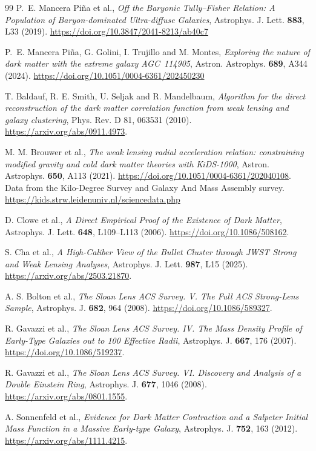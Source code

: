 \documentclass[11pt]{article}
\begin{document}
\begin{thebibliography}{99}
P.~E. Mancera Pi\~na et al.,
\emph{Off the Baryonic Tully--Fisher Relation: A Population of
Baryon-dominated Ultra-diffuse Galaxies},
Astrophys. J. Lett. \textbf{883}, L33 (2019).
\url{https://doi.org/10.3847/2041-8213/ab40c7}

P.~E. Mancera Pi\~na, G. Golini, I. Trujillo and M. Montes,
\emph{Exploring the nature of dark matter with the extreme galaxy AGC~114905},
Astron. Astrophys. \textbf{689}, A344 (2024).
\url{https://doi.org/10.1051/0004-6361/202450230}

T. Baldauf, R. E. Smith, U. Seljak and R. Mandelbaum,
\emph{Algorithm for the direct reconstruction of the dark matter correlation
function from weak lensing and galaxy clustering}, Phys. Rev. D 81,
063531 (2010). \url{https://arxiv.org/abs/0911.4973}.

M. M. Brouwer et al.,
\emph{The weak lensing radial acceleration relation: constraining modified
gravity and cold dark matter theories with KiDS-1000},
Astron. Astrophys. \textbf{650}, A113 (2021).
\url{https://doi.org/10.1051/0004-6361/202040108}.
Data from the Kilo-Degree Survey and Galaxy And Mass Assembly survey.
\url{https://kids.strw.leidenuniv.nl/sciencedata.php}

D. Clowe et al., \emph{A Direct Empirical Proof of the Existence of Dark
Matter}, Astrophys. J. Lett. \textbf{648}, L109--L113 (2006).
\url{https://doi.org/10.1086/508162}.

S. Cha et al., \emph{A High-Caliber View of the Bullet Cluster through
JWST Strong and Weak Lensing Analyses}, Astrophys. J. Lett.
\textbf{987}, L15 (2025). \url{https://arxiv.org/abs/2503.21870}.

A. S. Bolton et al., \emph{The Sloan Lens ACS Survey. V.
The Full ACS Strong-Lens Sample}, Astrophys. J. \textbf{682}, 964 (2008).
\url{https://doi.org/10.1086/589327}.

R. Gavazzi et al., \emph{The Sloan Lens ACS Survey. IV. The Mass Density
Profile of Early-Type Galaxies out to 100 Effective Radii},
Astrophys. J. \textbf{667}, 176 (2007). \url{https://doi.org/10.1086/519237}.

R. Gavazzi et al., \emph{The Sloan Lens ACS Survey. VI. Discovery and
Analysis of a Double Einstein Ring}, Astrophys. J. \textbf{677}, 1046 (2008).
\url{https://arxiv.org/abs/0801.1555}.

A. Sonnenfeld et al., \emph{Evidence for Dark Matter Contraction and a
Salpeter Initial Mass Function in a Massive Early-type Galaxy},
Astrophys. J. \textbf{752}, 163 (2012). \url{https://arxiv.org/abs/1111.4215}.


\end{thebibliography}
\end{document}
